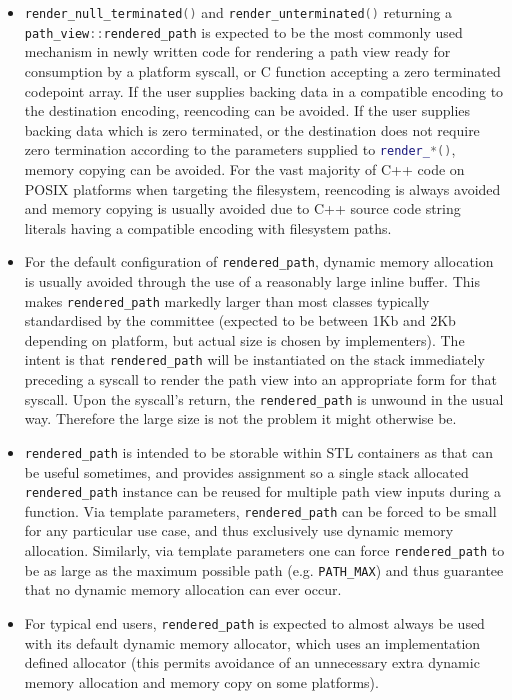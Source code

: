 \documentclass[11pt]{article}
\newcommand{\code}[2][cpp]{\lstinline[language=#1,basicstyle=\small\ttfamily]{#2}}
\begin{document}
\begin{itemize}
    \item \code{render_null_terminated()} and  \code{render_unterminated()} returning a \code{path_view::rendered_path} is expected to be the most commonly used mechanism in newly written code for rendering a path view ready for consumption by a platform syscall, or C function accepting a zero terminated codepoint array. If the user supplies backing data in a compatible encoding to the destination encoding, reencoding can be avoided. If the user supplies backing data which is zero terminated, or the destination does not require zero termination according to the parameters supplied to \code{render_*()}, memory copying can be avoided. For the vast majority of C++ code on POSIX platforms when targeting the filesystem, reencoding is always avoided and memory copying is usually avoided due to C++ source code string literals having a compatible encoding with filesystem paths.
    \item For the default configuration of \code{rendered_path}, dynamic memory allocation is usually avoided through the use of a reasonably large inline buffer. This makes \code{rendered_path} markedly larger than most classes typically standardised by the committee (expected to be between 1Kb and 2Kb depending on platform, but actual size is chosen by implementers). The intent is that \code{rendered_path} will be instantiated on the stack immediately preceding a syscall to render the path view into an appropriate form for that syscall. Upon the syscall's return, the \code{rendered_path} is unwound in the usual way. Therefore the large size is not the problem it might otherwise be.
    \item \code{rendered_path} is intended to be storable within STL containers as that can be useful sometimes, and provides assignment so a single stack allocated \code{rendered_path} instance can be reused for multiple path view inputs during a function. Via template parameters, \code{rendered_path} can be forced to be small for any particular use case, and thus exclusively use dynamic memory allocation. Similarly, via template parameters one can force \code{rendered_path} to be as large as the maximum possible path (e.g. \code{PATH_MAX}) and thus guarantee that no dynamic memory allocation can ever occur.
    \item For typical end users, \code{rendered_path} is expected to almost always be used with its default dynamic memory allocator, which uses an implementation defined allocator (this permits avoidance of an unnecessary extra dynamic memory allocation and memory copy on some platforms).
    

\end{itemize}
\end{document}
